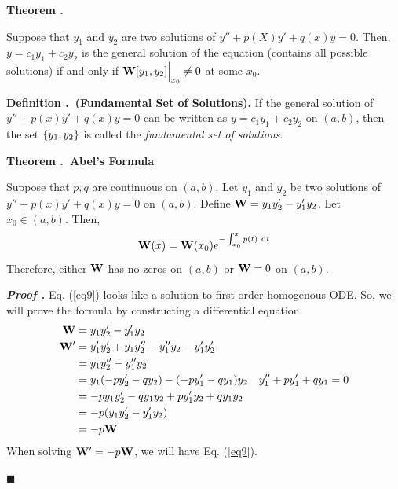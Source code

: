 \documentclass[12pt, a4paper]{article}
\newcounter{index}[subsection]
\newenvironment*{df}[1]{\par\noindent\textbf{Definition \thesubsection.\stepcounter{index}\theindex\ (#1).}}{\par}
\newenvironment*{thm}[1]{\begin{tcolorbox}\par\noindent\textbf{Theorem \thesubsection.\stepcounter{index}\theindex\ #1} \par}{\par\end{tcolorbox}}
\newcounter{nprf}[subsection]
\newenvironment*{prf}{\par\indent\textbf{\textit{Proof \stepcounter{nprf}\thenprf.}}}{\hfill$\blacksquare$\par}
\def\d{{\mathrm{d}}}
\def\W{\vb W}
\begin{document}
\begin{thm}{}
	Suppose that $y_1$ and $y_2$ are two solutions of $y''+p(X)y'+q(x)y=0$. Then, $y=c_1y_1+c_2y_2$ is the general solution of the equation (contains all possible	solutions) if and only if $\W[y_1,y_2]\Big\rvert_{x_0}\neq0$ at some $x_0$.
\end{thm}
\begin{df}{Fundamental Set of Solutions}
	If the general solution of $y''+p(x)y'+q(x)y=0$ can be written as $y=c_1y_1+c_2y_2$ on $(a,b)$, then the set $\qty{y_1,y_2}$ is called the \textit{fundamental set of solutions}.	
\end{df}
\begin{thm}{Abel's Formula}
	Suppose that $p,q$ are continuous on $(a,b)$. Let $y_1$ and $y_2$ be two solutions of $y''+p(x)y'+q(x)y=0$ on $(a,b)$. Define $\W=y_1y_2'-y_1'y_2$. Let $x_0\in(a,b)$. Then, \begin{equation}\label{eq9}\W(x)=\W\qty(x_0)e^{-\int_{x_0}^{x}p(t)\ \d{t}}\end{equation} Therefore, either $\W$ has no zeros on $(a,b)$ or $\W=0$ on $(a,b)$.
\end{thm}
\begin{prf}
	Eq. (\ref{eq9}) looks like a solution to first order homogenous ODE. So, we will prove the formula by constructing a differential equation. \begin{align*}\W&=y_1y_2'-y_1'y_2\\\W'&=y_1'y_2'+y_1y_2''-y_1''y_2-y_1'y_2'\\&=y_1y_2''-y_1''y_2\\&=y_1\qty(-py_2'-qy_2)-\qty(-py_1'-qy_1)y_2&y_1''+py_1'+qy_1=0\\&=-py_1y_2'-qy_1y_2+py_1'y_2+qy_1y_2\\&=-p(y_1y_2'-y_1'y_2)\\&=-p\W\end{align*} When solving $\W'=-p\W$, we will have Eq. (\ref{eq9}).
	
\end{prf}
\end{document}
